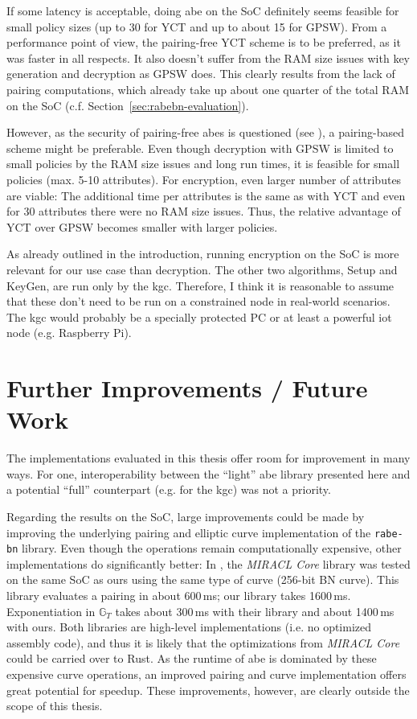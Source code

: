 If some latency is acceptable, doing \acrshort{abe} on the SoC definitely seems feasible for small policy sizes (up to 30 for YCT and up to about 15 for GPSW).
From a performance point of view, the pairing-free YCT scheme is to be preferred, as it was faster in all respects.
It also doesn't suffer from the RAM size issues with key generation and decryption as GPSW does.
This clearly results from the lack of pairing computations, which already take up about one quarter of the total RAM on the SoC (c.f. Section~\ref{sec:rabebn-evaluation}).

However, as the security of pairing-free \acrshort{abes} is questioned (see \cite{herranz_attacking_2020}), a pairing-based scheme might be preferable.
Even though decryption with GPSW is limited to small policies by the RAM size issues and long run times, it is feasible for small policies (max. 5-10 attributes).
For encryption, even larger number of attributes are viable: The additional time per attributes is the same as with YCT and even for 30 attributes there were no RAM size issues.
Thus, the relative advantage of YCT over GPSW becomes smaller with larger policies.

As already outlined in the introduction, running encryption on the SoC is more relevant for our use case than decryption. 
The other two algorithms, Setup and KeyGen, are run only by the \acrshort{kgc}.
Therefore, I think it is reasonable to assume that these don't need to be run on a constrained node in real-world scenarios.
The \acrshort{kgc} would probably be a specially protected PC or at least a powerful \acrshort{iot} node (e.g. Raspberry Pi).

\section{Further Improvements / Future Work}

The implementations evaluated in this thesis offer room for improvement in many ways.
For one, interoperability between the ``light'' \acrshort{abe} library presented here and a potential ``full'' counterpart (e.g. for the \acrshort{kgc}) was not a priority.

Regarding the results on the SoC, large improvements could be made by improving the underlying pairing and elliptic curve implementation of the \texttt{rabe-bn} library.
Even though the operations remain computationally expensive, other implementations do significantly better:
In \cite{scott_deployment_2020}, the \emph{MIRACL Core} library was tested on the same SoC as ours using the same type of curve (256-bit BN curve).
This library evaluates a pairing in about 600\,ms; our library takes 1600\,ms. 
Exponentiation in $\mathbb{G}_T$ takes about 300\,ms with their library and about 1400\,ms with ours. 
Both libraries are high-level implementations (i.e. no optimized assembly code), and thus it is likely that the optimizations from \emph{MIRACL Core} could be carried over to Rust.
As the runtime of \acrshort{abe} is dominated by these expensive curve operations, an improved pairing and curve implementation offers great potential for speedup.
These improvements, however, are clearly outside the scope of this thesis.

